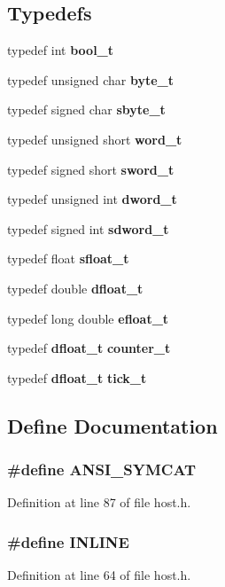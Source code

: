 \subsection*{Typedefs}
\begin{CompactItemize}
\item 
typedef int {\bf bool\_\-t}
\item 
typedef unsigned char {\bf byte\_\-t}
\item 
typedef signed char {\bf sbyte\_\-t}
\item 
typedef unsigned short {\bf word\_\-t}
\item 
typedef signed short {\bf sword\_\-t}
\item 
typedef unsigned int {\bf dword\_\-t}
\item 
typedef signed int {\bf sdword\_\-t}
\item 
typedef float {\bf sfloat\_\-t}
\item 
typedef double {\bf dfloat\_\-t}
\item 
typedef long double {\bf efloat\_\-t}
\item 
typedef {\bf dfloat\_\-t} {\bf counter\_\-t}
\item 
typedef {\bf dfloat\_\-t} {\bf tick\_\-t}
\end{CompactItemize}


\subsection{Define Documentation}
\subsubsection[{ANSI\_\-SYMCAT}]{\setlength{\rightskip}{0pt plus 5cm}\#define ANSI\_\-SYMCAT}\label{host_8h_3b379d477bda2d3e8802152a4745f7a1}




Definition at line 87 of file host.h.
\subsubsection[{INLINE}]{\setlength{\rightskip}{0pt plus 5cm}\#define INLINE}\label{host_8h_2eb6f9e0395b47b8d5e3eeae4fe0c116}




Definition at line 64 of file host.h.
